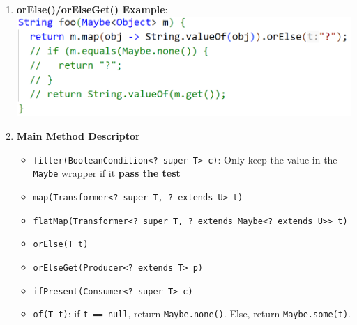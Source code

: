 \documentclass[10pt, landscape]{article}
\begin{document}
\begin{multicols}{4}
\begin{enumerate}
    \item \textbf{orElse()/orElseGet() Example}: \\
    \includegraphics[width=1\linewidth]{PE/PE2/images/15.png}
    \item \textbf{Main Method Descriptor}
    \begin{itemize}
        \item \texttt{filter(BooleanCondition<? super T> c)}: Only keep the value in the \texttt{Maybe} wrapper if it \textbf{pass the test}
        \item \texttt{map(Transformer<? super T, ? extends U> t)}
        \item \texttt{flatMap(Transformer<? super T, ? extends Maybe<? extends U>> t)}
        \item \texttt{orElse(T t)}
        \item \texttt{orElseGet(Producer<? extends T> p)}
        \item \texttt{ifPresent(Consumer<? super T> c)}
        \item \texttt{of(T t)}: if \texttt{t == null}, return \texttt{Maybe.none()}. Else, return \texttt{Maybe.some(t)}.
    \end{itemize}
\end{enumerate}


\end{multicols}
\end{document}
